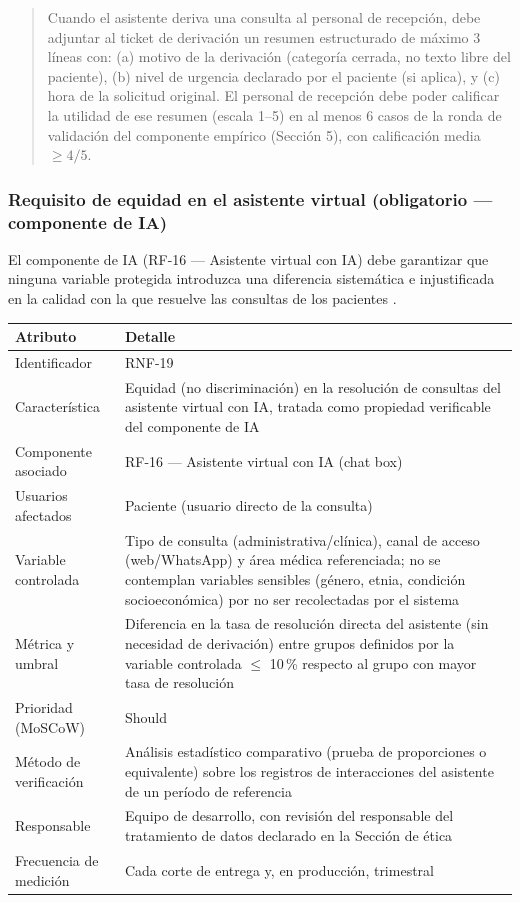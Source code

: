 \documentclass[11pt,a4paper]{article}
\begin{document}
	\begin{quote}
		Cuando el asistente deriva una consulta al personal de recepción, debe
		adjuntar al ticket de derivación un resumen estructurado de máximo
		3 líneas con: (a) motivo de la derivación (categoría cerrada, no texto
		libre del paciente), (b) nivel de urgencia declarado por el paciente
		(si aplica), y (c) hora de la solicitud original. El personal de
		recepción debe poder calificar la utilidad de ese resumen
		(escala 1--5) en al menos 6 casos de la ronda de validación del
		componente empírico (Sección 5), con calificación media \(\geq 4/5\).
	\end{quote}
	
	\subsubsection{ Requisito de equidad en el asistente virtual (obligatorio --- componente de IA)}
	
	El componente de IA (RF-16 --- Asistente virtual con IA) debe garantizar que ninguna variable protegida introduzca una diferencia sistemática e injustificada en la calidad con la que resuelve las consultas de los pacientes \cite{whoai2021,euaiact2024}.
	
	\begin{longtable}{p{} p{}}
		
		\toprule
		\textbf{Atributo} & \textbf{Detalle} \\
		\midrule
		\endhead
		
		Identificador & RNF-19 \\
		Característica & Equidad (no discriminación) en la resolución de consultas del asistente virtual con IA, tratada como propiedad verificable del componente de IA \\
		Componente asociado & RF-16 --- Asistente virtual con IA (chat box) \\
		Usuarios afectados & Paciente (usuario directo de la consulta) \\
		Variable controlada & Tipo de consulta (administrativa/clínica), canal de acceso (web/WhatsApp) y área médica referenciada; no se contemplan variables sensibles (género, etnia, condición socioeconómica) por no ser recolectadas por el sistema \\
		Métrica y umbral & Diferencia en la tasa de resolución directa del asistente (sin necesidad de derivación) entre grupos definidos por la variable controlada \(\leq\) 10\,\% respecto al grupo con mayor tasa de resolución \\
		Prioridad (MoSCoW) & Should \\
		Método de verificación & Análisis estadístico comparativo (prueba de proporciones o equivalente) sobre los registros de interacciones del asistente de un período de referencia \\
		Responsable & Equipo de desarrollo, con revisión del responsable del tratamiento de datos declarado en la Sección de ética \\
		Frecuencia de medición & Cada corte de entrega y, en producción, trimestral \\
		\bottomrule
	\end{longtable}
	
\end{document}
